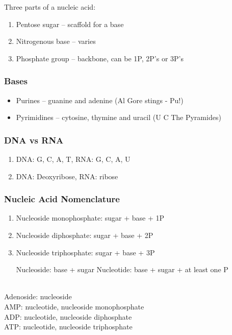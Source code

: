 \documentclass[11pt]{scrartcl}
\begin{document}
Three parts of a nucleic acid:

\begin{enumerate}
\item\label{item:11} Pentose sugar -- scaffold for a base

\item\label{item:12} Nitrogenous base -- varies

\item\label{item:13} Phosphate group -- backbone, can be 1P, 2P's or 3P's
\end{enumerate}

\subsubsection{Bases}

\begin{itemize}
\item Purines -- guanine and adenine (Al Gore stings - Pu!)

\item Pyrimidines -- cytosine, thymine and uracil (U C The Pyramides)
\end{itemize}

\subsubsection{DNA vs RNA}

\begin{enumerate}
\item\label{item:14} DNA: G, C, A, T, RNA: G, C, A, U

\item\label{item:15} DNA: Deoxyribose, RNA: ribose
\end{enumerate}

\subsubsection{Nucleic Acid Nomenclature}

\begin{enumerate}
\item\label{item:16} Nucleoside monophosphate: sugar + base + 1P

\item\label{item:17} Nucleoside diphosphate: sugar + base + 2P


\item\label{item:18} Nucleoside triphosphate: sugar + base + 3P

  Nucleoside: base + sugar
  Nucleotide: base + sugar + at least one P
\end{enumerate}
\begin{remark}\hfill\\
  Adenoside: nucleoside\\
  AMP: nucleotide, nucleoside monophosphate\\
  ADP: nucleotide, nucleoside diphosphate\\
  ATP: nucleotide, nucleoside triphosphate
\end{remark}
\end{document}
